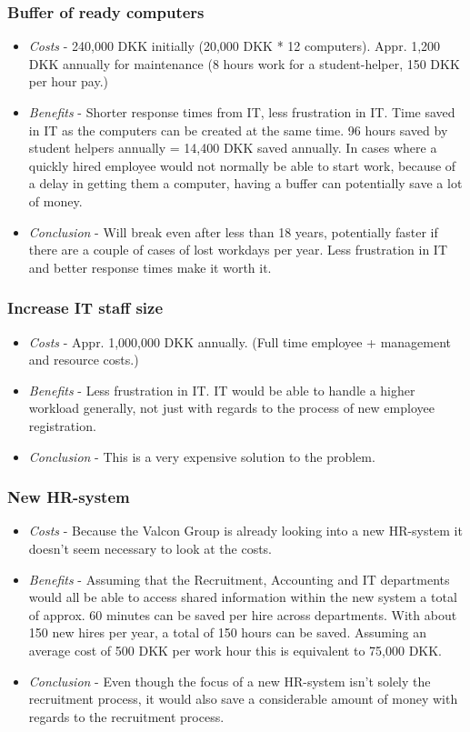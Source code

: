 \subsubsection{Buffer of ready computers}
\begin{itemize}
	\item \emph{Costs} - 240,000 DKK initially (20,000 DKK * 12 computers). Appr. 1,200 DKK annually for maintenance (8 hours work for a student-helper, 150 DKK per hour pay.)
	\item \emph{Benefits} - Shorter response times from IT, less frustration in IT. Time saved in IT as the computers can be created at the same time. 96 hours saved by student helpers annually = 14,400 DKK saved annually. In cases where a quickly hired employee would not normally be able to start work, because of a delay in getting them a computer, having a buffer can potentially save a lot of money.
	\item \emph{Conclusion} - Will break even after less than 18 years, potentially faster if there are a couple of cases of lost workdays per year. Less frustration in IT and better response times make it worth it.
\end{itemize}

\subsubsection{Increase IT staff size}
\begin{itemize}
	\item \emph{Costs} - Appr. 1,000,000 DKK annually. (Full time employee + management and resource costs.)
	\item \emph{Benefits} - Less frustration in IT. IT would be able to handle a higher workload generally, not just with regards to the process of new employee registration.
	\item \emph{Conclusion} - This is a very expensive solution to the problem. 
\end{itemize}

\subsubsection{New HR-system}
\begin{itemize}
	\item \emph{Costs} - Because the Valcon Group is already looking into a new HR-system it doesn't seem necessary to look at the costs.
	\item \emph{Benefits} - Assuming that the Recruitment, Accounting and IT departments would all be able to access shared information within the new system a total of approx. 60 minutes can be saved per hire across departments. With about 150 new hires per year, a total of 150 hours can be saved. Assuming an average cost of 500 DKK per work hour this is equivalent to 75,000 DKK.
	\item \emph{Conclusion} - Even though the focus of a new HR-system isn't solely the recruitment process, it would also save a considerable amount of money with regards to the recruitment process.
\end{itemize}

